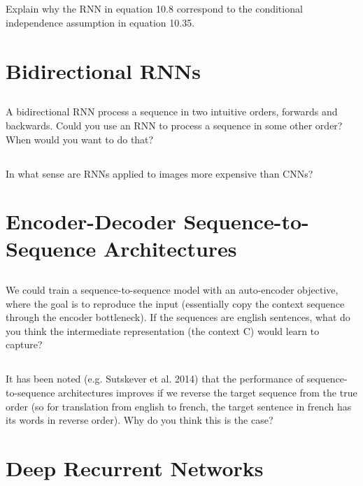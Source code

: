 \documentclass[a4paper]{report}
\begin{document}
    \subsection{}
    Explain why the RNN in equation 10.8 correspond to the conditional independence assumption in equation 10.35.

    \section{Bidirectional RNNs}
    \subsection{}
    A bidirectional RNN process a sequence in two intuitive orders, forwards and backwards. Could you use an RNN to process a sequence in some other order? When would you want to do that?
    \subsection{}
    In what sense are RNNs applied to images more expensive than CNNs?

    \section{Encoder-Decoder Sequence-to-Sequence Architectures}
    \subsection{}
    We could train a sequence-to-sequence model with an auto-encoder objective, where the goal is to
    reproduce the input (essentially copy the context sequence through the encoder bottleneck).
    If the sequences are english sentences, what do you think the intermediate
    representation (the context C) would learn to capture?
    \subsection{}
    It has been noted (e.g. Sutskever et al. 2014) that the performance of sequence-to-sequence architectures improves if we reverse the target sequence from the true order (so for translation from english to french, the target sentence in french has its words in reverse order). Why do you think this is the case?
    \section{Deep Recurrent Networks}
\end{document}
